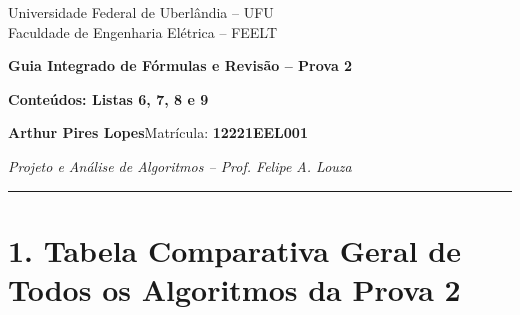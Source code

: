 \documentclass[11pt,a4paper]{article}
\newcommand{\secao}[1]{\section*{\color{azul}#1}}
\begin{document}
\begin{center}
  {\small Universidade Federal de Uberlândia -- UFU\\Faculdade de Engenharia Elétrica -- FEELT}\par
  \vspace{3pt}
  {\LARGE\bfseries\color{azul} Guia Integrado de Fórmulas e Revisão -- Prova 2}\par
  \vspace{3pt}
  {\large\textbf{Conteúdos: Listas 6, 7, 8 e 9}}\par
  \vspace{3pt}
  \textbf{Arthur Pires Lopes}\quad Matrícula: \textbf{12221EEL001}\par
  \textit{Projeto e Análise de Algoritmos -- Prof. Felipe A. Louza}
\end{center}
\hrule
\vspace{6pt}

\secao{1. Tabela Comparativa Geral de Todos os Algoritmos da Prova 2}
\end{document}
